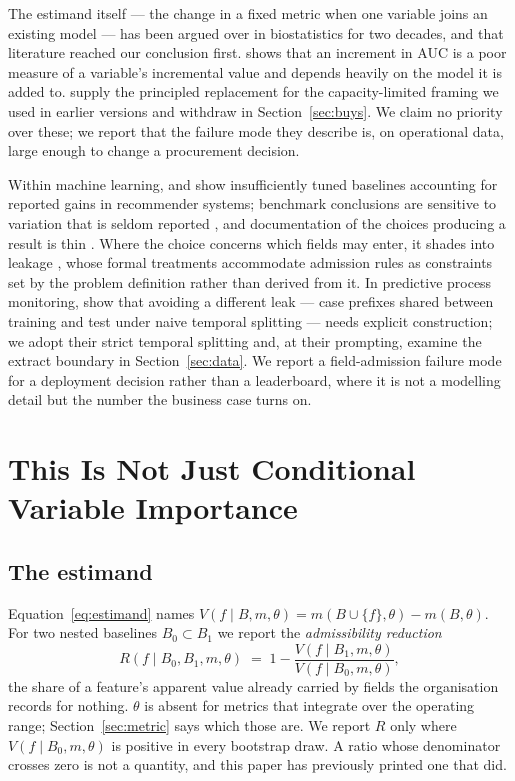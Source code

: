 \documentclass[preprint,12pt]{elsarticle}
\begin{document}
The estimand itself --- the change in a fixed metric when one variable joins
an existing model --- has been argued over in biostatistics for two decades,
and that literature reached our conclusion first. \citet{cook2007roc} shows
that an increment in AUC is a poor measure of a variable's incremental value
and depends heavily on the model it is added to. \citet{vickers2006dca}
supply the principled replacement for the capacity-limited framing we used in
earlier versions and withdraw in Section~\ref{sec:buys}. We claim no priority
over these; we report that the failure mode they describe is, on operational
data, large enough to change a procurement decision.

Within machine learning, \citet{rendle2019baselines} and
\citet{dacrema2019progress} show insufficiently tuned baselines accounting for
reported gains in recommender systems; benchmark conclusions are sensitive to
variation that is seldom reported \citep{bouthillier2021variance}, and
documentation of the choices producing a result is thin
\citep{gundersen2018reproducibility}. Where the choice concerns which fields
may enter, it shades into leakage \citep{kaufman2012leakage,kapoor2023leakage},
whose formal treatments accommodate admission rules as constraints set by the
problem definition rather than derived from it. In predictive process
monitoring, \citet{weytjens2022leakage} show that avoiding a different
leak --- case prefixes shared between training and test under naive temporal
splitting --- needs explicit construction; we adopt their strict temporal
splitting and, at their prompting, examine the extract boundary in
Section~\ref{sec:data}. We report a field-admission failure mode for a
deployment decision rather than a leaderboard, where it is not a modelling
detail but the number the business case turns on.

\section{This Is Not Just Conditional Variable Importance}
\label{sec:notvimp}

\subsection{The estimand}
Equation~\ref{eq:estimand} names
$V(f \mid B, m, \theta) = m(B \cup \{f\}, \theta) - m(B, \theta)$. For two
nested baselines $B_0 \subset B_1$ we report the \emph{admissibility
reduction}
\begin{equation}
R(f \mid B_0, B_1, m, \theta) \;=\; 1 - \frac{V(f \mid B_1, m, \theta)}
{V(f \mid B_0, m, \theta)},
\label{eq:reduction}
\end{equation}
the share of a feature's apparent value already carried by fields the
organisation records for nothing. $\theta$ is absent for metrics that
integrate over the operating range; Section~\ref{sec:metric} says which those
are. We report $R$ only where $V(f \mid B_0, m, \theta)$ is positive in every
bootstrap draw. A ratio whose denominator crosses zero is not a quantity, and
this paper has previously printed one that did.
\end{document}
